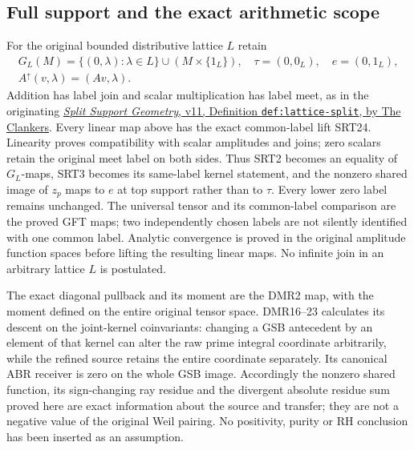\subsection{Full support and the exact arithmetic scope}
For the original bounded distributive lattice $L$ retain
\begin{equation}\tag{SRT24}
\begin{gathered}
G_L(M)=\{(0,\lambda):\lambda\in L\}\cup(M\times\{1_L\}),
\quad \tau=(0,0_L),\quad e=(0,1_L),\\
A^\uparrow(v,\lambda)=(Av,\lambda).
\end{gathered}
\end{equation}
Addition has label join and scalar multiplication has label meet,
as in the originating
\href{https://github.com/KokunoYumeto/zeta-function-research-reader/blob/a2851f9eb352e7e4376bc629de86fa4ed9c1c434/workbenches/splitzero-tandem/foundations/split-support-geometry-v11/split_support_geometry_arithmetic_curve_v11.tex}{\emph{Split Support Geometry}, v11,
Definition \texttt{def:lattice-split}, by The Clankers}.
Every linear map above has the exact common-label lift SRT24.
Linearity proves compatibility with scalar amplitudes and joins;
zero scalars retain the original meet label on both sides. Thus
SRT2 becomes an equality of $G_L$-maps, SRT3 becomes its
same-label kernel statement, and the nonzero shared image of $z_p$
maps to $e$ at top support rather than to $\tau$. Every lower
zero label remains unchanged. The universal tensor and its
common-label comparison are the proved GFT maps; two independently
chosen labels are not silently identified with one common label.
Analytic convergence is proved in the original amplitude function
spaces before lifting the resulting linear maps. No infinite join
in an arbitrary lattice $L$ is postulated.

The exact diagonal pullback and its moment are the DMR2 map, with
the moment defined on the entire original tensor space. DMR16--23
calculates its descent on the joint-kernel coinvariants: changing
a GSB antecedent by an element of that kernel can alter the raw
prime integral coordinate arbitrarily, while the refined source
retains the entire coordinate separately. Its canonical ABR
receiver is zero on the whole GSB image. Accordingly the nonzero
shared function, its sign-changing ray residue and the divergent
absolute residue sum proved here are exact information about the
source and transfer; they are not a negative value of the original
Weil pairing. No positivity, purity or RH conclusion has been
inserted as an assumption.
